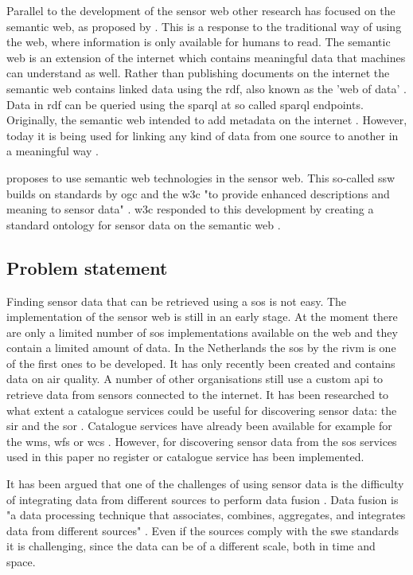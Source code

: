 Parallel to the development of the sensor web other research has focused on the semantic web, as proposed by \cite{LD:Berners-lee}. This is a response to the traditional way of using the web, where information is only available for humans to read. The semantic web is an extension of the internet which contains meaningful data that machines can understand as well. Rather than publishing documents on the internet the semantic web contains linked data using the \ac{rdf}, also known as the 'web of data' \citep{LD:Bizer}. Data in \ac{rdf} can be queried using the \ac{sparql} at so called \ac{sparql} endpoints. Originally, the semantic web intended to add metadata on the internet \citep{LD:W3C}. However, today it is being used for linking any kind of data from one source to another in a meaningful way \citep{LD:Cambridge}. 

\cite{SSW:Sheth} proposes to use semantic web technologies in the sensor web. This so-called \ac{ssw} builds on standards by \ac{ogc} and the \ac{w3c} "to provide enhanced descriptions and meaning to sensor data" \cite[p.78]{SSW:Sheth}. \ac{w3c} responded to this development by creating a standard ontology for sensor data on the semantic web \citep{SSW:SSN_incubatorGroup}. 
 
\subsection{Problem statement}
Finding sensor data that can be retrieved using a \ac{sos} is not easy. The implementation of the sensor web is still in an early stage. At the moment there are only a limited number of \ac{sos} implementations available on the web and they contain a limited amount of data. In the Netherlands the \ac{sos} by the \ac{rivm} is one of the first ones to be developed. It has only recently been created and contains data on air quality. A number of other organisations still use a custom \ac{api} to retrieve data from sensors connected to the internet. It has been researched to what extent a catalogue services could be useful for discovering sensor data: the \ac{sir} \citep{SW:OGC3} and the \ac{sor} \citep{SW:OGC4}. Catalogue services have already been available for example for the \ac{wms}, \ac{wfs} or \ac{wcs} \citep{SDI:OGC2}. However, for discovering sensor data from the \ac{sos} services used in this paper no register or catalogue service has been implemented. 

It has been argued that one of the challenges of using sensor data is the difficulty of integrating data from different sources to perform data fusion \citep{SSW:Corcho, SSW:Ji, SSW:Wang}. Data fusion is "a data processing technique that associates, combines, aggregates, and integrates data from different sources" \cite[p. 2]{SSW:Wang2}. Even if the sources comply with the \ac{swe} standards it is challenging, since the data can be of a different scale, both in time and space. 

